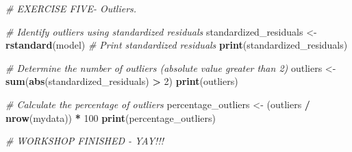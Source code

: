 \documentclass[
]{book}
\newenvironment{Shaded}{\begin{snugshade}}{\end{snugshade}}
\newcommand{\CommentTok}[1]{\textcolor[rgb]{0.56,0.35,0.01}{\textit{#1}}}
\newcommand{\DecValTok}[1]{\textcolor[rgb]{0.00,0.00,0.81}{#1}}
\newcommand{\FunctionTok}[1]{\textcolor[rgb]{0.13,0.29,0.53}{\textbf{#1}}}
\newcommand{\NormalTok}[1]{#1}
\newcommand{\OtherTok}[1]{\textcolor[rgb]{0.56,0.35,0.01}{#1}}
\newcommand{\SpecialCharTok}[1]{\textcolor[rgb]{0.81,0.36,0.00}{\textbf{#1}}}
\begin{document}
\begin{Shaded}
\begin{Highlighting}[]
\CommentTok{\# EXERCISE FIVE{-}  Outliers.}

\CommentTok{\# Identify outliers using standardized residuals}
\NormalTok{standardized\_residuals }\OtherTok{\textless{}{-}} \FunctionTok{rstandard}\NormalTok{(model)}
\CommentTok{\# Print standardized residuals}
\FunctionTok{print}\NormalTok{(standardized\_residuals)}

\CommentTok{\# Determine the number of outliers (absolute value greater than 2)}
\NormalTok{outliers }\OtherTok{\textless{}{-}} \FunctionTok{sum}\NormalTok{(}\FunctionTok{abs}\NormalTok{(standardized\_residuals) }\SpecialCharTok{\textgreater{}} \DecValTok{2}\NormalTok{)}
\FunctionTok{print}\NormalTok{(outliers)}

\CommentTok{\# Calculate the percentage of outliers}
\NormalTok{percentage\_outliers }\OtherTok{\textless{}{-}}\NormalTok{ (outliers }\SpecialCharTok{/} \FunctionTok{nrow}\NormalTok{(mydata)) }\SpecialCharTok{*} \DecValTok{100}
\FunctionTok{print}\NormalTok{(percentage\_outliers)}
\end{Highlighting}
\end{Shaded}

\begin{Shaded}
\begin{Highlighting}[]
\CommentTok{\# WORKSHOP FINISHED {-} YAY!!!}
\end{Highlighting}
\end{Shaded}



\end{document}
